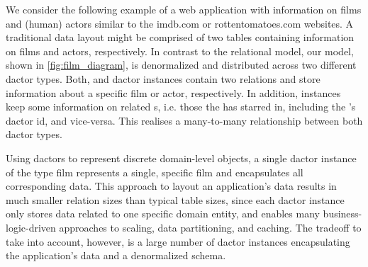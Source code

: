     We consider the following example of a web application with information on films and (human) actors similar to the imdb.com or rottentomatoes.com websites.
    A traditional data layout might be comprised of two tables containing information on films and actors, respectively.
    In contrast to the relational model, our model, shown in \cref{fig:film_diagram}, is denormalized and distributed across two different \gls{dactor} types.
    Both,  and  \gls{dactor} instances contain two \glspl{relation} and store information about a specific film or actor, respectively.
    In addition,  instances keep some information on related s, i.e. those the  has starred in, including the 's \gls{dactor} id, and vice-versa.
    This realises a many-to-many relationship between both \gls{dactor} types.

    Using \glspl{dactor} to represent discrete domain-level objects, a single \gls{dactor} instance of the type film represents a single, specific film and encapsulates all corresponding data.
    This approach to layout an application's data results in much smaller \gls{relation} sizes than typical table sizes, since each \gls{dactor} instance only stores data related to one specific domain entity, and enables many business-logic-driven approaches to scaling, data partitioning, and caching.
    The tradeoff to take into account, however, is a large number of \gls{dactor} instances encapsulating the application's data and a denormalized schema.

